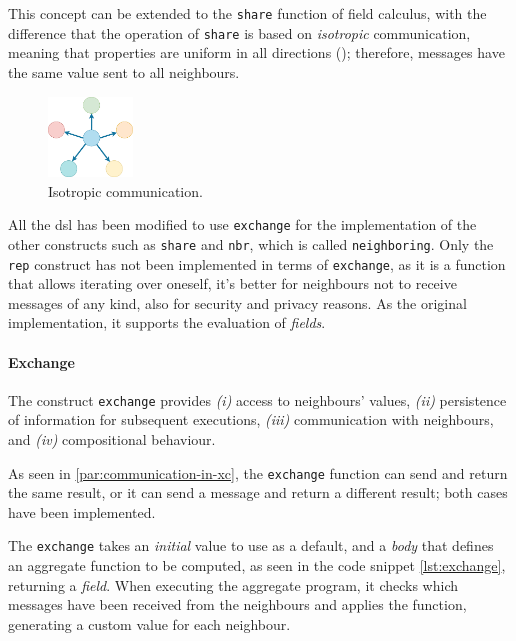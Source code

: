 This concept can be extended to the \texttt{share} function of field calculus, with the difference that the
operation of \texttt{share} is based on \emph{isotropic} communication, meaning that properties are uniform in all directions
(); therefore, messages have the same value sent to all neighbours.

\begin{figure}[h!]
    \centering
    \includegraphics[width=0.2\textwidth]{figures/isotropic}
    \caption{Isotropic communication.}
    \label{fig:isotropic}
\end{figure}

All the \ac{dsl} has been modified to use \texttt{exchange} for the implementation of the other constructs such as \texttt{share}
and \texttt{nbr}, which is called \texttt{neighboring}.
Only the \texttt{rep} construct has not been implemented in terms of \texttt{exchange}, as it is a function that allows iterating
over oneself, it's better for neighbours not to receive messages of any kind, also for security and privacy reasons.
As the original implementation, it supports the evaluation of \emph{fields}.

\paragraph{Exchange}
The construct \texttt{exchange} provides
    \emph{(i)} access to neighbours' values,
    \emph{(ii)} persistence of information for subsequent executions,
    \emph{(iii)} communication with neighbours, and
    \emph{(iv)} compositional behaviour.

As seen in \ref{par:communication-in-xc}, the \texttt{exchange} function can send and return the same result, or it
can send a message and return a different result; both cases have been implemented.


The \texttt{exchange} takes an \emph{initial} value to use as a default, and a \emph{body} that defines an aggregate
function to be computed, as seen in the code snippet \ref{lst:exchange}, returning a \emph{field}.
When executing the aggregate program, it checks which messages have been received from the neighbours and applies the function,
generating a custom value for each neighbour.

